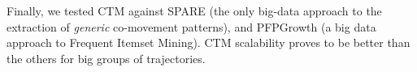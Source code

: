 \documentclass[
]{ceurart}
\newcommand{\mf}[1]{#1}
\begin{document}

Finally, we tested CTM against SPARE \citep{DBLP:journals/pvldb/FanZWT16} (the only big-data approach to the extraction of \textit{generic} co-movement patterns), and PFPGrowth \citep{DBLP:conf/recsys/LiWZZC08} (a big data approach to Frequent Itemset Mining).
CTM scalability proves to be better than the others for big groups of trajectories.
\end{document}
